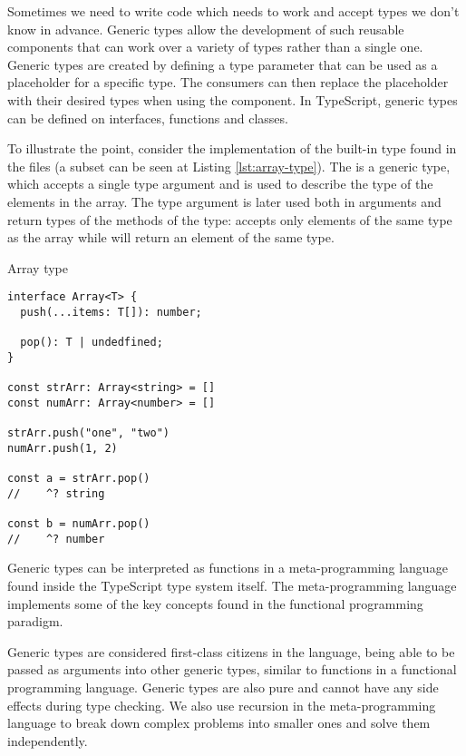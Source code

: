 Sometimes we need to write code which needs to work and accept types we don't know in advance. Generic types allow the development of such reusable components that can work over a variety of types rather than a single one. Generic types are created by defining a type parameter that can be used as a placeholder for a specific type. The consumers can then replace the placeholder with their desired types when using the component. In TypeScript, generic types can be defined on interfaces, functions and classes.

To illustrate the point, consider the implementation of the built-in  type found in the  files (a subset can be seen at Listing \ref{lst:array-type}). The  is a generic type, which accepts a single type argument  and is used to describe the type of the elements in the array. The type argument  is later used both in arguments and return types of the methods of the  type:  accepts only elements of the same type as the array while  will return an element of the same type.

\begin{listing}[ht]
  \caption{Array type}\label{lst:array-type}
  \begin{verbatim}
interface Array<T> {
  push(...items: T[]): number;

  pop(): T | undedfined;
}

const strArr: Array<string> = []
const numArr: Array<number> = []

strArr.push("one", "two")
numArr.push(1, 2)

const a = strArr.pop()
//    ^? string

const b = numArr.pop()
//    ^? number
\end{verbatim}
\end{listing}

Generic types can be interpreted as functions in a meta-programming language found inside the TypeScript type system itself. The meta-programming language implements some of the key concepts found in the functional programming paradigm.

Generic types are considered first-class citizens in the language, being able to be passed as arguments into other generic types, similar to functions in a functional programming language. Generic types are also pure and cannot have any side effects during type checking. We also use recursion in the meta-programming language to break down complex problems into smaller ones and solve them independently.

